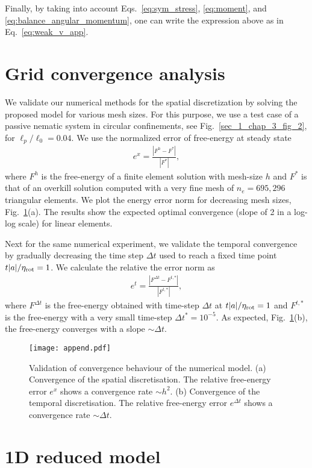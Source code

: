 Finally, by taking into account Eqs.~\eqref{eq:sym_stress}, \eqref{eq:moment}, and \eqref{eq:balance_angular_momentum}, one can write the expression above as in Eq.~\eqref{eq:weak_v_app}.
\section{Grid convergence analysis} \label{appendix_grid}
We validate our numerical methods for the spatial discretization by solving the proposed model for various mesh sizes. For this purpose, we use a test case of a passive nematic system in circular confinements, see Fig.~\ref{sec_1_chap_3_fig_2}, for $\ell_p/\ell_0=0.04$. We use the normalized error of free-energy at steady state 
\begin{align}	
	e^x = \frac{|F^h -F^*|}{|F^*|} , 
\end{align}
where $F^h$ is the free-energy of a finite element solution with mesh-size $h$ and $F^*$ is that of an overkill solution computed with a very fine mesh of $n_e = 695,296$ triangular elements. We plot the energy error norm for decreasing mesh sizes, Fig.~\ref{grid}(a). The results show the expected optimal convergence (slope of 2 in a log-log scale) for linear elements. 


Next for the same numerical experiment, we validate the temporal convergence by gradually decreasing the
time step $\Delta t$ used to reach a fixed time point $t|a|/\eta_{\rm rot}=1$. We calculate the relative  the error norm  as
\begin{align}	
	e^t = \frac{|F^{\Delta t} -F^{t,*}|}{|F^{t,*}|} , 
\end{align}
where $F^{\Delta t}$ is the free-energy obtained with time-step $\Delta t$  at $t|a|/\eta_{\rm rot}=1$ and   $F^{t,*}$ is the free-energy with a very small time-step $\Delta t^* = 10^{-5}$. As expected, Fig.~\ref{grid}(b), the free-energy converges with a slope $\sim \Delta t$.
\begin{figure}[tb]
	\centering
	\texttt{[image: append.pdf]}
	\caption{\label{grid} Validation of convergence behaviour of the numerical model. (a) Convergence of the spatial discretisation. The relative free-energy error $e^x$  shows a convergence rate $\sim h^{2}$. (b) Convergence of the temporal discretisation. The relative free-energy error  $e^{\Delta t}$  shows a convergence rate $\sim \Delta t$.}
\end{figure}

	\section{\label{sec:level1}1D reduced model} \label{appendix_1_sec_4}

